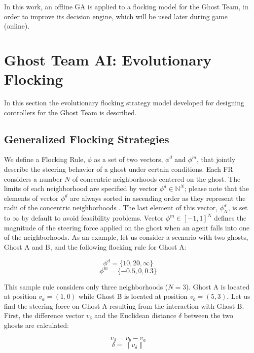 \documentclass{llncs}
\begin{document}
In this work, an offline GA is applied to a flocking model for the Ghost Team, in order to improve its decision engine, which will be used later during game (online).

%
%

\section{Ghost Team AI: Evolutionary Flocking}
\label{sec:ghosts_ai}
In this section the evolutionary flocking strategy model developed for designing controllers for the Ghost Team is described.

\subsection{Generalized Flocking Strategies}
\label{subsec:flocking_strategies}

We define a Flocking Rule, $\phi$ as a set of two vectors, $\phi^d$ and $\phi^m$, that jointly describe the steering behavior of a ghost under certain conditions. Each FR considers a number $N$ of concentric neighborhoods centered on the ghost. The limits of each neighborhood are specified by vector $\phi^d \in \mathbb{N}^N$; please note that the elements of vector $\phi^d$ are always sorted in ascending order as they represent the radii of the concentric neighborhoods . The last element of this vector, $\phi_N^d$, is set to $\infty$ by default to avoid feasibility problems. Vector $\phi^m \in [-1, 1]^N$ defines the magnitude of the steering force applied on the ghost when an agent falls into one of the neighborhoods. As an example, let us consider a scenario with two ghosts, Ghost A and B, and the following flocking rule for Ghost A:

$$\phi^d = \{10, 20, \infty\}$$
$$\phi^m = \{-0.5, 0, 0.3\}$$

This sample rule considers only three neighborhoods ($N=3$). Ghost A is located at position $v_a=(1,0)$ while Ghost B is located at position $v_b=(5,3)$. Let us find the steering force on Ghost A resulting from the interaction with Ghost B. First, the difference vector $v_\delta$ and the Euclidean distance $\delta$ between the two ghosts are calculated:

\begin{equation}
	\label{eq:v_delta}
	v_\delta=v_b-v_a
\end{equation}
\begin{equation}
	\label{eq:delta}
	\delta=\|v_\delta\|
\end{equation}
\end{document}
